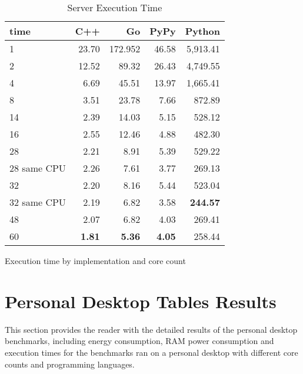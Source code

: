 \begin{table}[H]
    \centering
    \begin{tabular}{lrrrr}
        \hline
        time         & C++             & Go            & PyPy          & Python     \\
        \hline
        1            & 23.70           & 172.952       & 46.58         & 5,913.41        \\
        2            & 12.52           & 89.32         & 26.43         & 4,749.55        \\
        4            & 6.69            & 45.51         & 13.97         & 1,665.41        \\
        8	           & 3.51  	         & 23.78 	       & 7.66          & 872.89          \\
        14           & 2.39            & 14.03         & 5.15          & 528.12          \\
        16           & 2.55            & 12.46         & 4.88          & 482.30          \\
        28           & 2.21            & 8.91          & 5.39          & 529.22          \\
        28 same CPU  & 2.26            & 7.61          & 3.77          & 269.13          \\
        32           & 2.20            & 8.16          & 5.44          & 523.04          \\
        32 same CPU  & 2.19            & 6.82          & 3.58          & \textbf{244.57} \\
        48           & 2.07            & 6.82          & 4.03          & 269.41          \\
        60           & \textbf{1.81}   & \textbf{5.36} & \textbf{4.05} & 258.44          \\
        \hline
    \end{tabular}
\caption{Server Execution Time}{Execution time by implementation and core count}
\label{tab:server-execution-time}
\end{table}

\section{Personal Desktop Tables Results}

This section provides the reader with the detailed results of the personal desktop benchmarks, including energy consumption, RAM power consumption and execution times for the benchmarks ran on a personal desktop with different core counts and programming languages.

